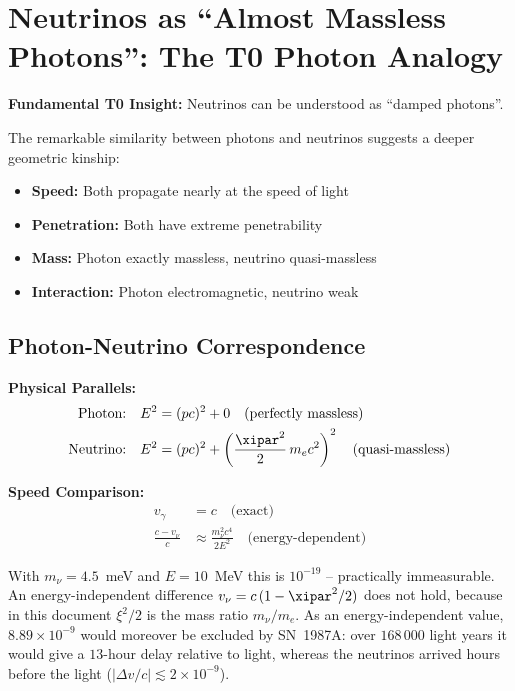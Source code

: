 	\section{Neutrinos as ``Almost Massless Photons'': The T0 Photon Analogy}
	
	\begin{speculation}
		\textbf{Fundamental T0 Insight:} Neutrinos can be understood as ``damped photons''.
		
		The remarkable similarity between photons and neutrinos suggests a deeper geometric kinship:
		\begin{itemize}
			\item \textbf{Speed:} Both propagate nearly at the speed of light
			\item \textbf{Penetration:} Both have extreme penetrability
			\item \textbf{Mass:} Photon exactly massless, neutrino quasi-massless
			\item \textbf{Interaction:} Photon electromagnetic, neutrino weak
		\end{itemize}
	\end{speculation}
	
	\subsection{Photon-Neutrino Correspondence}
	
	\begin{photon}
		\textbf{Physical Parallels:}
		\begin{align}
			\text{Photon:} \quad &E^2 = (pc)^2 + 0 \quad \text{(perfectly massless)} \\
			\text{Neutrino:} \quad &E^2 = (pc)^2 + \left(\frac{\xipar^2}{2}\, m_e c^2\right)^2 \quad \text{(quasi-massless)}
		\end{align}
		
		\textbf{Speed Comparison:}
		\begin{align}
			v_\gamma &= c \quad \text{(exact)} \\
						\frac{c - v_\nu}{c} &\approx \frac{m_\nu^2 c^4}{2E^2} \quad \text{(energy-dependent)}
		\end{align}

		With $m_\nu = 4.5$~meV and $E = 10$~MeV this is $10^{-19}$ -- practically immeasurable. An energy-independent difference $v_\nu = c\,(1 - \xipar^2/2)$ does not hold, because in this document $\xi^2/2$ is the mass ratio $m_\nu/m_e$. As an energy-independent value, $8.89\times10^{-9}$ would moreover be excluded by SN~1987A: over $168\,000$ light years it would give a $13$-hour delay relative to light, whereas the neutrinos arrived hours before the light ($|\Delta v/c| \lesssim 2\times10^{-9}$).
	\end{photon}
	
